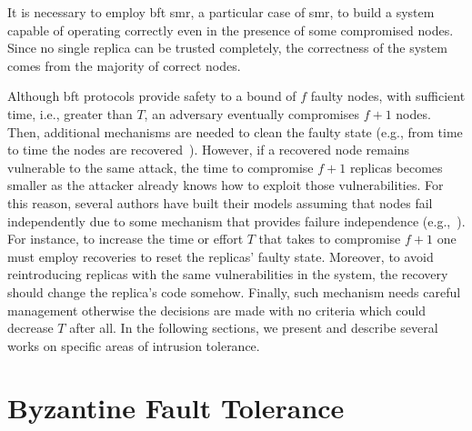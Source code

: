 It is necessary to employ \gls{bft} \gls{smr}, a particular case of \gls{smr}, to build a system capable of operating correctly even in the presence of some compromised nodes.
Since no single replica can be trusted completely, the correctness of the system comes from the majority of correct nodes. 


Although \gls{bft} protocols provide safety to a bound of $f$ faulty nodes, with sufficient time, i.e., greater than $T$, an adversary eventually compromises $f+1$ nodes.
Then, additional mechanisms are needed to clean the faulty state (e.g., from time to time the nodes are recovered~\cite{Castro:2002}).
However, if a recovered node remains vulnerable to the same attack, the time to compromise $f+1$ replicas becomes smaller as the attacker already knows how to exploit those vulnerabilities.
For this reason, several authors have built their models assuming that nodes fail independently due to some mechanism that provides failure independence (e.g.,~\cite{Castro:2002,Bessani:2008,Veronese:2013,Sousa:2010}).
For instance, to increase the time or effort $T$ that takes to compromise $f+1$ one must employ recoveries to reset the replicas' faulty state. 
Moreover, to avoid reintroducing replicas with the same vulnerabilities in the system, the recovery should change the replica's code somehow.
Finally, such mechanism needs careful management otherwise the decisions are made with no criteria which could decrease $T$ after all.
In the following sections, we present and describe several works on specific areas of intrusion tolerance.


\section{Byzantine Fault Tolerance}

